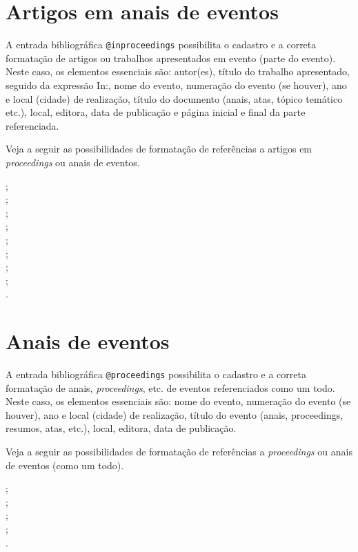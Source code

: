 \begin{apendicesenv}
\section{Artigos em anais de eventos}
\label{sec:inproceedings}

A entrada bibliográfica \verb|@inproceedings| possibilita o cadastro e a correta formatação de artigos ou trabalhos apresentados em evento (parte do evento). Neste caso, os elementos essenciais são: autor(es), título do trabalho apresentado, seguido da expressão In:, nome do evento, numeração do evento (se houver), ano e local (cidade) de realização, título do documento (anais, atas, tópico temático etc.), local, editora, data de publicação e página inicial e final da parte referenciada.

Veja a seguir as possibilidades de formatação de referências a artigos em \textit{proceedings} ou anais de eventos.

{\small
	\cite{brayner1994} ;\\
	\cite{Faloutsos1999} ;\\
	\cite{guncho1998} ;\\
	\cite{krzyzanowski1996} ;\\
	\cite{malagrino1985} ;\\
	\cite{martin1997} ;\\
	\cite{oliveira1996} ;\\
	\cite{sabroza1998} ;\\
	\cite{souza1994}.\\
}



\section{Anais de eventos}
\label{sec:proceedings}

A entrada bibliográfica \verb|@proceedings| possibilita o cadastro e a correta formatação de anais, \textit{proceedings}, etc. de  eventos referenciados como um todo. Neste caso, os elementos essenciais são: nome do evento, numeração do evento (se houver), ano e local (cidade) de realização, título do evento (anais, proceedings, resumos, atas, etc.), local, editora, data de publicação.

Veja a seguir as possibilidades de formatação de referências a \textit{proceedings} ou anais de eventos (como um todo).

{\small
	\cite{biblioteconomia1979} ;\\
	\cite{chemical1984} ;\\
	\cite{cientifica1996} ;\\
	\cite{quimica1997} ;\\
	\cite{redes1995}.\\
}




\end{apendicesenv}
